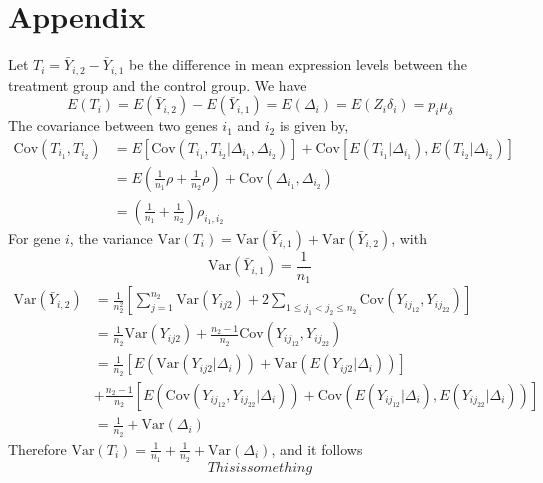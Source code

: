 \documentclass[11pt, a4paper]{article}
\begin{document}
\section{Appendix}\label{section:appendix}
Let $T_i=\bar{Y}_{i,2}-\bar{Y}_{i,1}$ be the difference in mean expression levels between the treatment group and the control group. We have 
\[E(T_i) = E(\bar{Y}_{i,2})-E(\bar{Y}_{i,1}) = E(\Delta_i) = E(Z_i\delta_i) = p_i\mu_{\delta}\]
The covariance between two genes $i_1$ and $i_2$ is given by, 
\begin{equation}
\begin{aligned}
\text{Cov}(T_{i_1}, T_{i_2}) & = E\left[\text{Cov}(T_{i_1}, T_{i_2}|\Delta_{i_1}, \Delta_{i_2}) \right]  + \text{Cov}\left[E(T_{i_1}|\Delta_{i_1}), E(T_{i_2}|\Delta_{i_2})\right] \\
& = E\left(\frac{1}{n_1}\rho + \frac{1}{n_2}\rho\right) + \text{Cov}(\Delta_{i_1}, \Delta_{i_2})\\
& = \left(\frac{1}{n_1} + \frac{1}{n_2}\right)\rho_{i_1,i_2}
\end{aligned}
\end{equation}
For gene $i$, the variance $\text{Var}(T_i) = \text{Var}(\bar{Y}_{i, 1}) + \text{Var}(\bar{Y}_{i, 2})$, with
\[\text{Var}(\bar{Y}_{i, 1}) = \frac{1}{n_1}\] 
\begin{equation}
\begin{aligned}
\text{Var}(\bar{Y}_{i, 2}) & = \frac{1}{n_2^2}\left[\sum_{j=1}^{n_2}\text{Var}(Y_{ij2}) + 2\sum_{1\leq j_1<j_2 \leq n_2} \text{Cov}(Y_{ij_12}, Y_{ij_22})\right] \\
& = \frac{1}{n_2}\text{Var}(Y_{ij2}) + \frac{n_2-1}{n_2} \text{Cov}(Y_{ij_12}, Y_{ij_22})\\
& = \frac{1}{n_2}\left[E\left(\text{Var}(Y_{ij2}|\Delta_i)\right) + \text{Var}\left(E(Y_{ij2}|\Delta_i)\right)\right] \\ \text{~~~} &+\frac{n_2-1}{n_2}\left[E\left(\text{Cov}(Y_{ij_12}, Y_{ij_22}|\Delta_i)\right) + \text{Cov}\left(E(Y_{ij_12}|\Delta_i), E(Y_{ij_22}|\Delta_i)\right)\right] \\
& = \frac{1}{n_2} + \text{Var}(\Delta_i)
\end{aligned}
\end{equation}
Therefore $\text{Var}(T_i)  = \frac{1}{n_1} + \frac{1}{n_2} + \text{Var}(\Delta_i)$, and it follows 
\begin{equation}\label{eq:tvar}
This is something
\end{equation}



\newpage



\end{document}
